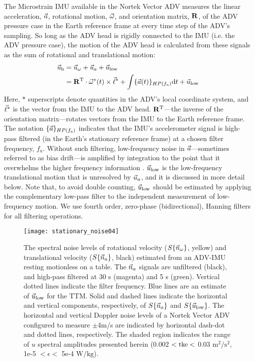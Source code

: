 The Microstrain IMU available in the Nortek Vector ADV measures the linear acceleration, ${\vec{a}}$, rotational motion, $\vec{\omega}$, and orientation matrix, $\mathbf{R}$, of the ADV pressure case in the Earth reference frame at every time step of the ADV's sampling. So long as the ADV head is rigidly connected to the IMU (i.e. the ADV pressure case), the motion of the ADV head is calculated from these signals as the sum of rotational and translational motion:
\begin{align}
  \label{eqn:uhead}
\begin{split}
  \vec{u}_\mathrm{h} & = \vec{u}_\omega + \vec{u}_a + \vec{u}_\mathrm{low} \\
      & = \mathbf{R}^\mathrm{T} \cdot \vec{\omega}^*(t)\times\vec{\ell}^* + \int \{{\vec{a}}(t)\}_{HP(f_{a})} \mathrm{d}t + \vec{u}_\mathrm{low}
\end{split}
\end{align}
Here, $*$ superscripts denote quantities in the ADV's local coordinate system, and $\vec{\ell}^*$ is the vector from the IMU to the ADV head. $\mathbf{R}^\mathrm{T}$---the inverse of the orientation matrix---rotates vectors from the IMU to the Earth reference frame. The notation $\{{\vec{a}}\}_{HP(f_a)}$ indicates that the IMU's accelerometer signal is high-pass filtered (in the Earth's stationary reference frame) at a chosen filter frequency, $f_a$. Without such filtering, low-frequency noise in ${\vec{a}}$---sometimes referred to as bias drift---is amplified by integration to the point that it overwhelms the higher frequency information \cite[]{Barshan+Whyte1995, Bevly2004, Gulmammadov2009}. $\vec{u}_\mathrm{low}$ is the low-frequency translational motion that is unresolved by $\vec{u}_a$, and it is discussed in more detail below. Note that, to avoid double counting, $\vec{u}_\mathrm{low}$ should be estimated by applying the complementary low-pass filter to the independent measurement of low-frequency motion. We use fourth order, zero-phase (bidirectional), Hanning filters for all filtering operations.

\begin{figure}
  \centering
  \texttt{[image: stationary\_noise04]}
  \caption{The spectral noise levels of rotational velocity ($S\{\vec{n}_{\omega}\}$, yellow) and translational velocity ($S\{\vec{n}_{a}\}$, black) estimated from an ADV-IMU resting motionless on a table. The $\vec{n}_{a}$ signals are unfiltered (black), and high-pass filtered at 30 s (magenta) and 5 s (green). Vertical dotted lines indicate the filter frequency.  Blue lines are an estimate of $\vec{u}_\mathrm{low}$ for the TTM. Solid and dashed lines indicate the horizontal and vertical components, respectively, of $S\{\vec{n}_{a}\}$ and $S\{\vec{u}_\mathrm{low}\}$. The horizontal and vertical Doppler noise levels of a Nortek Vector ADV configured to measure $\pm$4m/s are indicated by horizontal dash-dot and dotted lines, respectively. The shaded region indicates the range of $u$ spectral amplitudes presented herein (0.002 $< \mathrm{tke} <$ 0.03 $\mathrm{m^2/s^2}$, 1e-5 $< \epsilon <$ 5e-4 $\mathrm{W/kg}$).}
  \label{fig:stnoise}
\end{figure}

